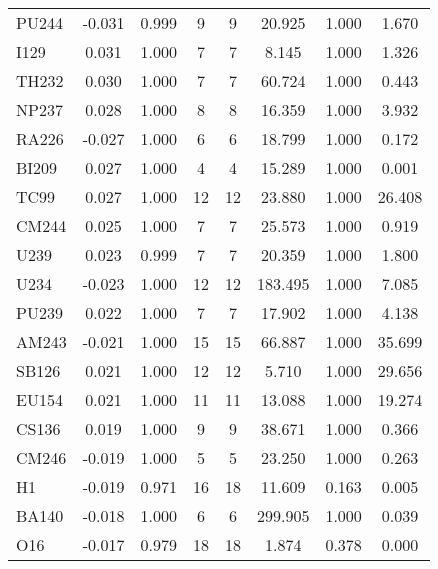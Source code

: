 \begin{tabular}{|l|ccccccc|}
PU244 & -0.031 & 0.999 & 9 & 9 & 20.925 & 1.000 & 1.670\\
I129 & 0.031 & 1.000 & 7 & 7 & 8.145 & 1.000 & 1.326\\
TH232 & 0.030 & 1.000 & 7 & 7 & 60.724 & 1.000 & 0.443\\
NP237 & 0.028 & 1.000 & 8 & 8 & 16.359 & 1.000 & 3.932\\
RA226 & -0.027 & 1.000 & 6 & 6 & 18.799 & 1.000 & 0.172\\
BI209 & 0.027 & 1.000 & 4 & 4 & 15.289 & 1.000 & 0.001\\
TC99 & 0.027 & 1.000 & 12 & 12 & 23.880 & 1.000 & 26.408\\
CM244 & 0.025 & 1.000 & 7 & 7 & 25.573 & 1.000 & 0.919\\
U239 & 0.023 & 0.999 & 7 & 7 & 20.359 & 1.000 & 1.800\\
U234 & -0.023 & 1.000 & 12 & 12 & 183.495 & 1.000 & 7.085\\
PU239 & 0.022 & 1.000 & 7 & 7 & 17.902 & 1.000 & 4.138\\
AM243 & -0.021 & 1.000 & 15 & 15 & 66.887 & 1.000 & 35.699\\
SB126 & 0.021 & 1.000 & 12 & 12 & 5.710 & 1.000 & 29.656\\
EU154 & 0.021 & 1.000 & 11 & 11 & 13.088 & 1.000 & 19.274\\
CS136 & 0.019 & 1.000 & 9 & 9 & 38.671 & 1.000 & 0.366\\
CM246 & -0.019 & 1.000 & 5 & 5 & 23.250 & 1.000 & 0.263\\
H1 & -0.019 & 0.971 & 16 & 18 & 11.609 & 0.163 & 0.005\\
BA140 & -0.018 & 1.000 & 6 & 6 & 299.905 & 1.000 & 0.039\\
O16 & -0.017 & 0.979 & 18 & 18 & 1.874 & 0.378 & 0.000\\
\hline
\end{tabular}